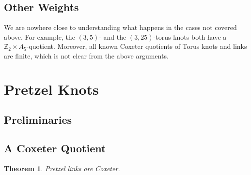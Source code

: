 \documentclass{article}
\newtheorem{theorem}{Theorem}[section]
\theoremstyle{definition}
\begin{document}
\subsection{Other Weights}
We are nowhere close to understanding what happens in the cases not covered above. For example, the $(3, 5)$- and the $(3, 25)$-torus knots both have a $\mathbb{Z}_2 \times A_5$-quotient. Moreover, all known Coxeter quotients of Torus knots and links are finite, which is not clear from the above arguments.

\newpage

\section{Pretzel Knots}
\subsection{Preliminaries}
\subsection{A Coxeter Quotient}
\begin{theorem}\label{thm:pretzel-links-are-coxeter}
Pretzel links are Coxeter. 
\end{theorem}
\end{document}
